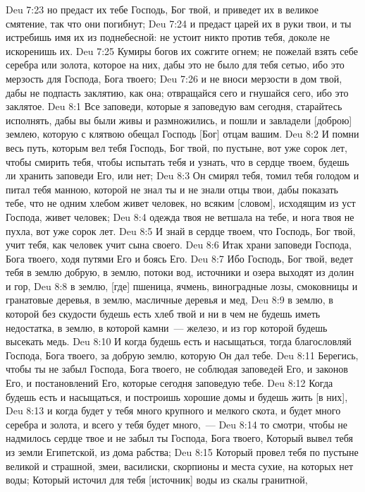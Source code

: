 \vs Deu 7:23 но предаст их тебе Господь, Бог твой, и приведет их в великое смятение, так что они погибнут;
\vs Deu 7:24 и предаст царей их в руки твои, и ты истребишь имя их из поднебесной: не устоит никто против тебя, доколе не искоренишь их.
\vs Deu 7:25 Кумиры богов их сожгите огнем; не пожелай взять себе серебра или золота, которое на них, дабы это не было для тебя сетью, ибо это мерзость для Господа, Бога твоего;
\vs Deu 7:26 и не вноси мерзости в дом твой, дабы не подпасть заклятию, как она; отвращайся сего и гнушайся сего, ибо это заклятое.
\vs Deu 8:1 Все заповеди, которые я заповедую вам сегодня, старайтесь исполнять, дабы вы были живы и размножились, и пошли и завладели [доброю] землею, которую с клятвою обещал Господь [Бог] отцам вашим.
\vs Deu 8:2 И помни весь путь, которым вел тебя Господь, Бог твой, по пустыне, вот уже сорок лет, чтобы смирить тебя, чтобы испытать тебя и узнать, что в сердце твоем, будешь ли хранить заповеди Его, или нет;
\vs Deu 8:3 Он смирял тебя, томил тебя голодом и питал тебя манною, которой не знал ты и не знали отцы твои, дабы показать тебе, что не одним хлебом живет человек, но всяким [словом], исходящим из уст Господа, живет человек;
\vs Deu 8:4 одежда твоя не ветшала на тебе, и нога твоя не пухла, вот уже сорок лет.
\vs Deu 8:5 И знай в сердце твоем, что Господь, Бог твой, учит тебя, как человек учит сына своего.
\vs Deu 8:6 Итак храни заповеди Господа, Бога твоего, ходя путями Его и боясь Его.
\vs Deu 8:7 Ибо Господь, Бог твой, ведет тебя в землю добрую, в землю,  потоки вод, источники и озера выходят из долин и гор,
\vs Deu 8:8 в землю, [где] пшеница, ячмень, виноградные лозы, смоковницы и гранатовые деревья, в землю,  масличные деревья и мед,
\vs Deu 8:9 в землю, в которой без скудости будешь есть хлеб твой и ни в чем не будешь иметь недостатка, в землю, в которой камни~--- железо, и из гор которой будешь высекать медь.
\vs Deu 8:10 И когда будешь есть и насыщаться, тогда благословляй Господа, Бога твоего, за добрую землю, которую Он дал тебе.
\vs Deu 8:11 Берегись, чтобы ты не забыл Господа, Бога твоего, не соблюдая заповедей Его, и законов Его, и постановлений Его, которые сегодня заповедую тебе.
\vs Deu 8:12 Когда будешь есть и насыщаться, и построишь хорошие домы и будешь жить [в них],
\vs Deu 8:13 и когда будет у тебя много крупного и мелкого скота, и будет много серебра и золота, и всего у тебя будет много,~---
\vs Deu 8:14 то смотри, чтобы не надмилось сердце твое и не забыл ты Господа, Бога твоего, Который вывел тебя из земли Египетской, из дома рабства;
\vs Deu 8:15 Который провел тебя по пустыне великой и страшной,  змеи, василиски, скорпионы и места сухие, на которых нет воды; Который источил для тебя [источник] воды из скалы гранитной,
